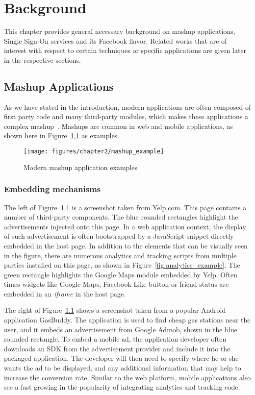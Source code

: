 \chapter{Background}

This chapter provides general necessary background on mashup applications, Single Sign-On services and its Facebook flavor.  Related works that are of interest with respect to certain techniques or specific applications are given later in the respective sections.

\section{Mashup Applications}
\label{sec:bg_mashup_apps}
As we have stated in the introduction, modern applications are often composed of first party code and many third-party modules, which makes these applications a complex mashup~\cite{MashupDef}.  Mashups are common in web and mobile applications, as shown here in Figure~\ref{fig:mashup_example} as examples.

\begin{figure}[bth]
\centering
\texttt{[image: figures/chapter2/mashup\_example]}
\caption{Modern mashup application examples}
\label{fig:mashup_example}
\end{figure}

\subsection{Embedding mechanisms}

The left of Figure~\ref{fig:mashup_example} is a screenshot taken from Yelp.com.  This page contains a number of third-party components.  The blue rounded rectangles highlight the advertisements injected onto this page.  In a web application context, the display of such advertisement is often bootstrapped by a JavaScript snippet directly embedded in the host page.  In addition to the elements that can be visually seen in the figure, there are numerous analytics and tracking scripts from multiple parties installed on this page, as shown in Figure~\ref{fig:analytics_example}.  The green rectangle highlights the Google Maps module embedded by Yelp.  Often times widgets like Google Maps, Facebook Like button or friend status are embedded in an \emph{iframe} in the host page.  

The right of Figure~\ref{fig:mashup_example} shows a screenshot taken from a popular Android application GasBuddy.  The application is used to find cheap gas stations near the user, and it embeds an advertisement from Google Admob, shown in the blue rounded rectangle.  To embed a mobile ad, the application developer often downloads an SDK from the advertisement provider and include it into the packaged application.  The developer will then need to specify where he or she wants the ad to be displayed, and any additional information that may help to increase the conversion rate.  Similar to the web platform, mobile applications also see a fast growing in the popularity of integrating analytics and tracking code.  

